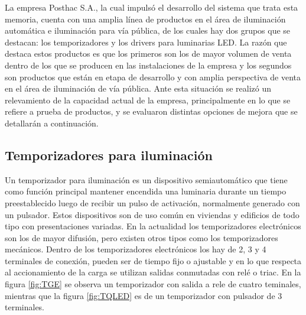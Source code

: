 La empresa Posthac S.A., la cual impulsó el desarrollo del sistema que trata esta memoria, cuenta con una amplia línea de productos en el área de iluminación automática e iluminación para vía pública, de los cuales hay dos grupos que se destacan: los temporizadores y los drivers para luminarias LED. La razón que destaca estos productos es que los primeros son los de mayor volumen de venta dentro de los que se producen en las instalaciones de la empresa y los segundos son productos que están en etapa de desarrollo y con amplia perspectiva de venta en el área de iluminación de vía pública.
Ante esta situación se realizó un relevamiento de la capacidad actual de la empresa, principalmente en lo que se refiere a prueba de productos, y se evaluaron distintas opciones de mejora que se detallarán a continuación.


\subsection{Temporizadores para iluminación}

Un temporizador para iluminación es un dispositivo semiautomático que tiene como función principal mantener encendida una luminaria durante un tiempo preestablecido luego de recibir un pulso de activación, normalmente generado con un pulsador. Estos dispositivos son de uso común en viviendas y edificios de todo tipo con presentaciones variadas. En la actualidad los temporizadores electrónicos son los de mayor difusión, pero existen otros tipos como los temporizadores mecánicos.
Dentro de los temporizadores electrónicos los hay de 2, 3 y 4 terminales de conexión, pueden ser de tiempo fijo o ajustable y en lo que respecta al accionamiento de la carga se utilizan salidas conmutadas con relé o triac. En la figura \ref{fig:TGE} se observa un temporizador con salida a rele de cuatro teminales, mientras que la figura \ref{fig:TQLED} es de un temporizador con pulsador de 3 terminales.

